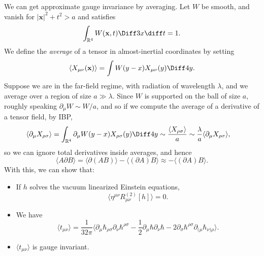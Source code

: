 \documentclass[12pt]{article}
\begin{document}
We can get approximate gauge invariance by averaging. Let $W$ be smooth, and vanish for $|\mathbf{x}|^2 + t^2 > a$ and satisfies
\[
\int_{\mathbb{R}^4} W(\mathbf{x}, t) \Diff 3 x \diff t= 1.
\]
We define the \emph{average} of a tensor in almost-inertial coordinates by setting
\[
\langle X_{\mu\nu}(\mathbf{x})\rangle = \int W(y - x) X_{\mu\nu}(y) \Diff 4 y.
\]
Suppose we are in the far-field regime, with radiation of wavelength $\lambda$, and we average over a region of size $a \gg \lambda$. Since $W$ is supported on the ball of size $a$, roughly speaking $\partial_\mu W \sim W/a$, and so if we compute the average of a derivative of a tensor field, by IBP,
\begin{align*} %
	\langle \partial_\mu X_{\rho\sigma} \rangle &= \int_{\mathbb{R}^4} \partial_\mu W (y - x) X_{\rho\sigma} (y) \Diff 4 y \sim \frac{\langle X_{\rho\sigma}\rangle }{a} \sim \frac{\lambda}{a} \langle \partial_\mu X_{\rho\sigma}\rangle,
\end{align*}
so we can ignore total derivatives inside averages, and hence
\[
\langle A \partial B \rangle = \langle \partial(A B) \rangle - \langle (\partial A) B \rangle \approx - \langle (\partial A) B \rangle.
\]
With this, we can show that:
\begin{itemize}
	\item If $h$ solves the vacuum linearized Einstein equations,
		\[
			\langle \eta^{\mu\nu} R_{\mu\nu}^{(2)} [h] \rangle = 0.
		\]
	\item We have
		\[
			\langle t_{\mu\nu} \rangle = \frac 1{32\pi} \langle \partial_\mu \hbar_{\rho\sigma} \partial_\nu \hbar^{\rho\sigma} - \frac 12 \partial_\mu \hbar \partial_\nu \hbar - 2 \partial_\sigma \hbar^{\rho\sigma} \partial_{(\mu} \hbar_{\nu)\rho} \rangle.
		\]
	\item $\langle t_{\mu\nu}\rangle$ is gauge invariant.
\end{itemize}
\end{document}
